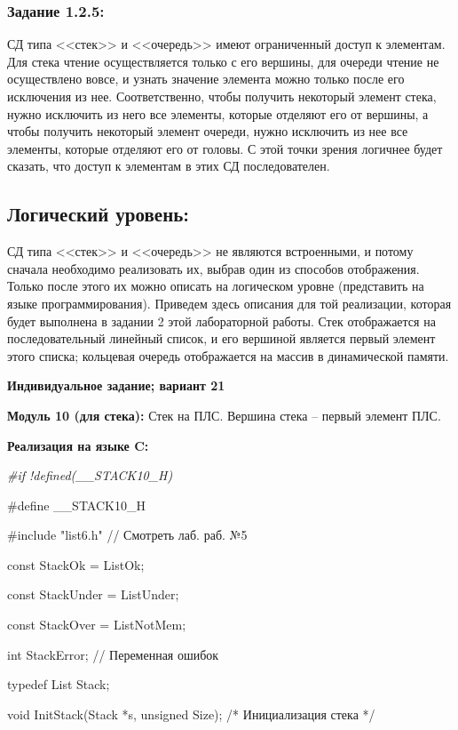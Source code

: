 \documentclass[12pt]{article}
\begin{document}
{	\subsubsection{Задание 1.2.5:}
	\label{task_1_2_5}
	СД типа <<стек>> и <<очередь>> имеют ограниченный доступ к элементам. Для стека чтение осуществляется только с его вершины, для очереди чтение не осуществлено вовсе, и узнать значение элемента можно только после его исключения из нее. Соответственно, чтобы получить некоторый элемент стека, нужно исключить из него все элементы, которые отделяют его от вершины, а чтобы получить некоторый элемент очереди, нужно исключить из нее все элементы, которые отделяют его от головы. С этой точки зрения логичнее будет сказать, что доступ к элементам в этих СД последователен.
	
	\subsection{Логический уровень:}
	\label{task_1_3}
	СД типа <<стек>> и <<очередь>> не являются встроенными, и потому сначала необходимо реализовать их, выбрав один из способов отображения. Только после этого их можно описать на логическом уровне (представить на языке программирования). Приведем здесь описания для той реализации, которая будет выполнена в задании 2 этой лабораторной работы. Стек отображается на последовательный линейный список, и его вершиной является первый элемент этого списка; кольцевая очередь отображается на массив в динамической памяти.
	
	\begin{center}
	{\bf Индивидуальное задание; вариант 21}
	\end{center}
	{\bf Модуль 10 (для стека):} Стек на ПЛС. Вершина стека – первый элемент ПЛС.
	
	{\bf Реализация на языке C:}
	
	{\it \#if !defined(\_\_STACK10\_H)
		
		\#define \_\_STACK10\_H
		
		\#include "list6.h" // Смотреть лаб. раб. №5
		
		const StackOk = ListOk;
		
		const StackUnder = ListUnder;
		
		const StackOver = ListNotMem;
		
		int   StackError; // Переменная ошибок
		
		typedef List Stack;
		
		void InitStack(Stack *s, unsigned Size);  /* Инициализация стека */
		
}}
\end{document}
